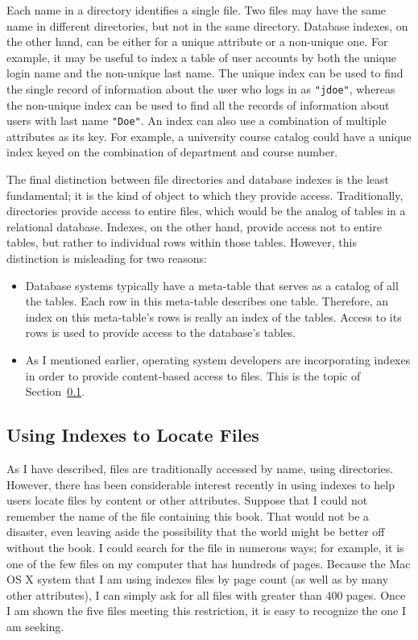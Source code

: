 Each name in a directory identifies a single file.  Two files may have
the same name in different directories, but not in the same directory.
Database indexes, on the other hand, can be either for a unique
attribute or a non-unique one.  For example, it may be useful to index
a table of user accounts by both the unique login name and the
non-unique last name.  The unique index can be used to find the single
record of information about the user who logs in as {\tt "jdoe"},
whereas the non-unique index can be used to find all the records of
information about users with last name {\tt "Doe"}.    An index can
also use a combination of multiple attributes as its key.  For
example, a university course catalog could have a unique index
keyed on the combination of department and course number.

The final distinction between file directories and database indexes is
the least fundamental; it is the kind of object to which they provide
access.  Traditionally, directories provide access to entire files,
which would be the analog of tables in a relational database.
Indexes, on the other hand, provide access not to entire tables, but
rather to individual rows within those tables.  However, this
distinction is misleading for two reasons:
\begin{itemize}
\item
Database systems typically have a meta-table that serves as a catalog
of all the tables.  Each row in this meta-table describes one table.
Therefore, an index on this meta-table's rows is really an index of
the tables.  Access to its rows is used to provide access to the
database's tables.
\item
As I mentioned earlier, operating system developers are incorporating
indexes in order to provide content-based access to files.  This is
the topic of Section~\ref{spotlight-section}.
\end{itemize}

\subsection{Using Indexes to Locate Files}\label{spotlight-section}

As I have described, files are traditionally accessed by name, using
directories.  However, there has been considerable interest recently
in using indexes to help users locate files by content or other
attributes. Suppose that I could not remember the name
of the file containing this book.  That would not be a disaster, even
leaving aside the possibility that the world might be better off
without the book.  I could search for the file in numerous ways; for
example, it is one of the few files on my computer that has hundreds
of pages.  Because the Mac OS X system that I am using indexes files
by page count (as well as by many other attributes), I can simply ask for all
files with greater than 400 pages.  Once I am shown the five files
meeting this restriction, it is easy to recognize the one I am seeking.

